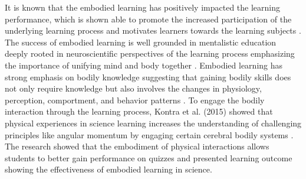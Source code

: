 


It is known that the embodied learning has positively impacted the learning performance, which is shown able to promote the increased participation of the underlying learning process and motivates learners towards the learning subjects \cite{kontra2012embodied,ioannou2020technology}. The success of embodied learning is well grounded in mentalistic education deeply rooted in neuroscientific perspectives of the learning process emphasizing the importance of unifying mind and body together \cite{macedonia2019embodied}. Embodied learning has strong emphasis on bodily knowledge suggesting that gaining bodily skills does not only require knowledge but also involves the changes in physiology, perception, comportment, and behavior patterns \cite{downey2010practice}. To engage the bodily interaction through the learning process, Kontra et al. (2015) showed that physical experiences in science learning increases the understanding of challenging principles like angular momentum by engaging certain cerebral bodily systems \cite{kontra2015physical}. The research showed that the embodiment of physical interactions allows students to better gain performance on quizzes and presented learning outcome showing the effectiveness of embodied learning in science. 


